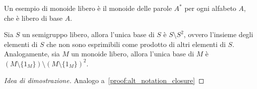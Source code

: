 Un esempio di monoide libero è il monoide delle parole \(A^*\) per ogni alfabeto \(A\), che è libero di base \(A\).

\begin{proposition}
  Sia \(S\) un semigruppo libero, allora l'unica base di \(S\) è \(S \setminus S^2\), ovvero l'insieme degli elementi di \(S\) che non sono esprimibili come prodotto di altri elementi di \(S\).
  Analogamente, sia \(M\) un monoide libero, allora l'unica base di \(M\) è \((M\setminus \{1_M\}) \setminus {(M\setminus \{1_M\})}^2\).
\end{proposition}
\begin{proof}[Idea di dimostrazione]
  Analogo a~\ref{proof:alt_notation_closure}
\end{proof}